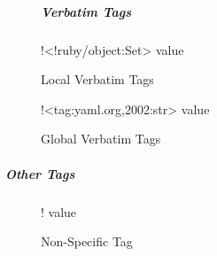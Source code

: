 \begin{figure}[H]
\subparagraph{Verbatim Tags}
  \begin{minipage}[t]{0.48\textwidth}
    \vspace{0pt}
    \begin{bchart}[max=9, width=0.85\textwidth]
    \end{bchart}
  \end{minipage}
  \begin{minipage}[t]{0.48\textwidth}
    \vspace{0pt}
    \begin{yamlcode}
      !<!ruby/object:Set> value
    \end{yamlcode}
  \end{minipage}
  \caption{Local Verbatim Tags}
\end{figure}

\begin{figure}[H]
  \begin{minipage}[t]{0.48\textwidth}
    \vspace{0pt}
    \begin{bchart}[max=9, width=0.85\textwidth]
    \end{bchart}
  \end{minipage}
  \begin{minipage}[t]{0.48\textwidth}
    \vspace{0pt}
    \begin{yamlcode}
      !<tag:yaml.org,2002:str> value
    \end{yamlcode}
  \end{minipage}
  \caption{Global Verbatim Tags}
\end{figure}

\subparagraph{Other Tags}

\begin{figure}[H]
  \begin{minipage}[t]{0.48\textwidth}
    \vspace{0pt}
    \begin{bchart}[max=9, width=0.85\textwidth]
    \end{bchart}
  \end{minipage}
  \begin{minipage}[t]{0.48\textwidth}
    \vspace{0pt}
    \begin{yamlcode}
      ! value
    \end{yamlcode}
  \end{minipage}
  \caption{Non-Specific Tag}
\end{figure}

